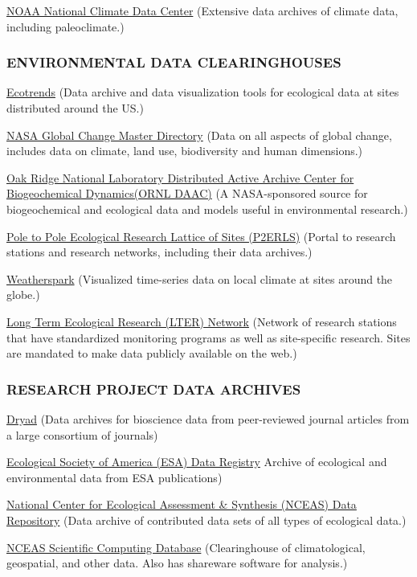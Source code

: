 \documentclass[
]{article}
\begin{document}
\href{http://www.ncdc.noaa.gov/oa/ncdc.html}{NOAA National Climate Data
Center} (Extensive data archives of climate data, including
paleoclimate.)

\hypertarget{environmental-data-clearinghouses}{%
\subsubsection{ENVIRONMENTAL DATA
CLEARINGHOUSES}\label{environmental-data-clearinghouses}}

\href{http://www.ecotrends.info/EcoTrends/}{Ecotrends} (Data archive and
data visualization tools for ecological data at sites distributed around
the US.)

\href{http://gcmd.nasa.gov/index.html}{NASA Global Change Master
Directory} (Data on all aspects of global change, includes data on
climate, land use, biodiversity and human dimensions.)

\href{http://daac.ornl.gov/index.shtml}{Oak Ridge National Laboratory
Distributed Active Archive Center for Biogeochemical Dynamics(ORNL
DAAC)} (A NASA-sponsored source for biogeochemical and ecological data
and models useful in environmental research.)

\href{http://www.p2erls.net/}{Pole to Pole Ecological Research Lattice
of Sites (P2ERLS)} (Portal to research stations and research networks,
including their data archives.)

\href{http://weatherspark.com/}{Weatherspark} (Visualized time-series
data on local climate at sites around the globe.)

\href{http://www.lternet.edu/}{Long Term Ecological Research (LTER)
Network} (Network of research stations that have standardized monitoring
programs as well as site-specific research. Sites are mandated to make
data publicly available on the web.)

\hypertarget{research-project-data-archives}{%
\subsubsection{RESEARCH PROJECT DATA
ARCHIVES}\label{research-project-data-archives}}

\href{http://datadryad.org/}{Dryad} (Data archives for bioscience data
from peer-reviewed journal articles from a large consortium of journals)

\href{http://esapubs.org/archive/archive_D.htm}{Ecological Society of
America (ESA) Data Registry} Archive of ecological and environmental
data from ESA publications)

\href{http://knb.ecoinformatics.org/knb/style/skins/nceas/index.jsp}{National
Center for Ecological Assessment \& Synthesis (NCEAS) Data Repository}
(Data archive of contributed data sets of all types of ecological data.)

\href{http://www.nceas.ucsb.edu/scicomp/}{NCEAS Scientific Computing
Database} (Clearinghouse of climatological, geospatial, and other data.
Also has shareware software for analysis.)
\end{document}
